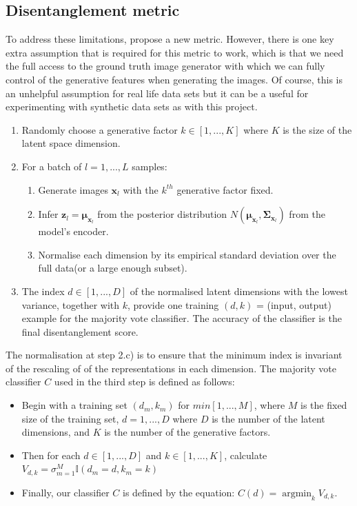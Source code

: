     \subsection{Disentanglement metric \citep{kim2018disentangling}} \label{subsec:metric_kim}
        To address these limitations, \cite{kim2018disentangling} propose a new metric. However, there is one key extra assumption that is required for this metric to work, which is that we need the full access to the ground truth image generator with which we can fully control of the generative features when generating the images. Of course, this is an unhelpful assumption for real life data sets but it can be a useful for experimenting with synthetic data sets as with this project.
        
        \begin{enumerate}
            \item Randomly choose a generative factor $k \in [1,...,K]$ where $K$ is the size of the latent space dimension.
            \item For a batch of $l = 1,...,L$ samples:
                \begin{enumerate}
                    \item Generate images $\bm{x}_l$ with the $k^{th}$ generative factor fixed.
                    \item Infer $\bm{z}_l = \bm{\mu}_{\bm{x}_l}$ from the posterior distribution $N(\bm{\mu}_{\bm{x}_l}, \bm{\Sigma}_{\bm{x}_l})$ from the model's encoder.
                    \item Normalise each dimension by its empirical standard deviation over the full data(or a large enough subset).
                \end{enumerate}
            \item The index $d \in [1,...,D]$ of the normalised latent dimensions with the lowest variance, together with $k$, provide one training $(d,k)$ = (input, output) example for the majority vote classifier. The accuracy of the classifier is the final disentanglement score.
        \end{enumerate}
        
        The normalisation at step 2.c) is to ensure that the minimum index is invariant of the rescaling of of the representations in each dimension. The majority vote classifier $C$ used in the third step is defined as follows:
        
        \begin{itemize}
            \item Begin with a training set $(d_m, k_m)$ for $m in [1,...,M]$, where $M$ is the fixed size of the training set, $d=1,...,D$ where $D$ is the number of the latent dimensions, and $K$ is the number of the generative factors.
            \item Then for each $d \in [1,...,D]$ and $k \in [1,...,K]$, calculate $V_{d,k} = \sigma_{m=1}^M \mathbb{I}(d_m = d, k_m = k)$
            \item Finally, our classifier $C$ is defined by the equation: $C(d) = \operatorname*{argmin}_k V_{d, k}$.
        \end{itemize}
        

